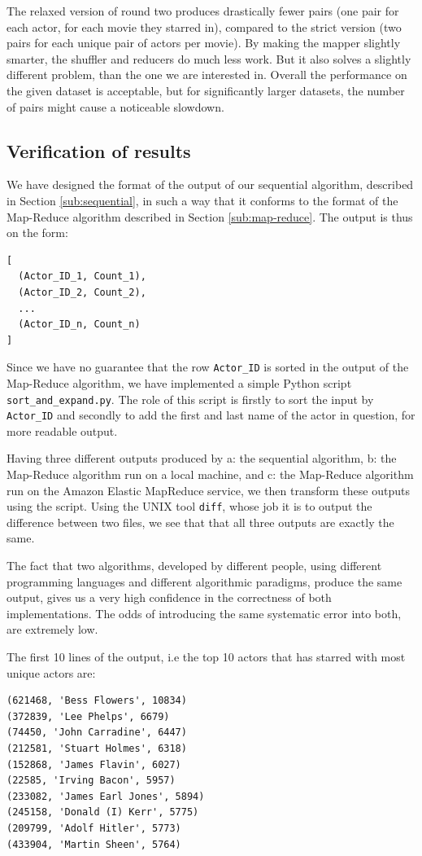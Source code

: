 \documentclass[a4paper,11pt]{article}
\begin{document}
The relaxed version of round two produces drastically fewer pairs (one pair for each actor, for each movie they starred in), compared to the strict version (two pairs for each unique pair of actors per movie). By making the mapper slightly smarter, the shuffler and reducers do much less work. But it also solves a slightly different problem, than the one we are interested in. Overall the performance on the given dataset is acceptable, but for significantly larger datasets, the number of pairs might cause a noticeable slowdown. 


\subsection{Verification of results}
\label{sub:verification}
We have designed the format of the output of our sequential algorithm, described in Section \ref{sub:sequential}, in such a way that it conforms to the format of the Map-Reduce algorithm described in Section \ref{sub:map-reduce}. 
The output is thus on the form:
\begin{verbatim}
[ 
  (Actor_ID_1, Count_1),
  (Actor_ID_2, Count_2),
  ...
  (Actor_ID_n, Count_n)
]
\end{verbatim}
Since we have no guarantee that the row \texttt{Actor\_ID} is sorted in the output of the Map-Reduce algorithm, we have implemented a simple Python script \texttt{sort\_and\_expand.py}. 
The role of this script is firstly to sort the input by \texttt{Actor\_ID} and secondly to add the first and last name of the actor in question, for more readable output.

Having three different outputs produced by a: the sequential algorithm, b: the Map-Reduce algorithm run on a local machine, and c: the Map-Reduce algorithm run on the Amazon Elastic MapReduce service, we then transform these outputs using the script.
Using the UNIX tool \texttt{diff}, whose job it is to output the difference between two files, we see that that all three outputs are exactly the same.

The fact that two algorithms, developed by different people, using different programming languages and different algorithmic paradigms, produce the same output, gives us a very high confidence in the correctness of both implementations. The odds of introducing the same systematic error into both, are extremely low.

The first 10 lines of the output, i.e the top 10 actors that has starred with most unique actors are: 
\begin{verbatim}
(621468, 'Bess Flowers', 10834)
(372839, 'Lee Phelps', 6679)
(74450, 'John Carradine', 6447)
(212581, 'Stuart Holmes', 6318)
(152868, 'James Flavin', 6027)
(22585, 'Irving Bacon', 5957)
(233082, 'James Earl Jones', 5894)
(245158, 'Donald (I) Kerr', 5775)
(209799, 'Adolf Hitler', 5773)
(433904, 'Martin Sheen', 5764)
\end{verbatim}
\end{document}
